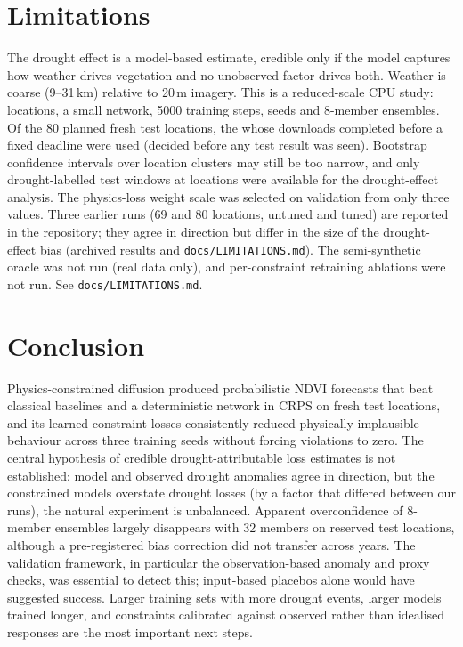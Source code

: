 \documentclass[10pt]{article}
\begin{document}
\section{Limitations}
The drought effect is a model-based estimate, credible only if the model captures how weather drives vegetation and no
unobserved factor drives both. Weather is coarse (9--31\,km) relative to 20\,m imagery. This is a reduced-scale CPU
study:  locations, a small network, 5000 training steps,  seeds and 8-member ensembles. Of the 80
planned fresh test locations, the  whose downloads completed before a fixed deadline were used (decided
before any test result was seen). Bootstrap confidence intervals over  location clusters may still be
too narrow, and only  drought-labelled test windows at  locations were available for
the drought-effect analysis. The physics-loss weight scale was selected on validation from only three values.
Three earlier runs (69 and 80 locations, untuned and tuned) are reported in the repository; they agree in direction
but differ in the size of the drought-effect bias (archived results and \texttt{docs/LIMITATIONS.md}). The semi-synthetic oracle was
not run (real data only), and per-constraint retraining ablations were not run. See \texttt{docs/LIMITATIONS.md}.

\section{Conclusion}
Physics-constrained diffusion produced probabilistic NDVI forecasts that beat classical baselines and a deterministic
network in CRPS on fresh test locations, and its learned constraint losses consistently reduced physically
implausible behaviour across three training seeds without forcing violations to zero. The central hypothesis of credible
drought-attributable loss estimates is not established: model and observed drought anomalies agree in direction, but
the constrained models overstate drought losses (by a factor that differed between our runs), the natural experiment
is unbalanced. Apparent overconfidence of 8-member ensembles largely disappears with 32 members on reserved test
locations, although a pre-registered bias correction did not transfer across years. The validation framework, in particular the observation-based
anomaly and proxy checks, was essential to detect this; input-based placebos alone would have suggested success.
Larger training sets with more drought events, larger models trained longer, and constraints calibrated against
observed rather than idealised responses are the most important next steps.
\end{document}
